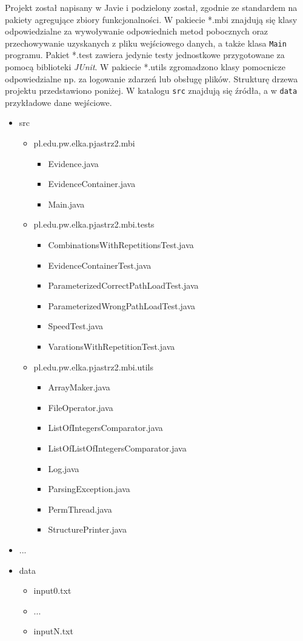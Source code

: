 \documentclass[11pt,a4paper]{article}
\begin{document}
Projekt został napisany w Javie i podzielony został, zgodnie ze standardem na pakiety agregujące zbiory funkcjonalności. W pakiecie *.mbi znajdują się klasy odpowiedzialne za wywoływanie odpowiednich metod pobocznych oraz przechowywanie uzyskanych z pliku wejściowego danych, a także klasa {\tt Main} programu. Pakiet *.test zawiera jedynie testy jednostkowe przygotowane za pomocą biblioteki \emph{JUnit}\cite{junit}. W pakiecie *.utils zgromadzono klasy pomocnicze odpowiedzialne np. za logowanie zdarzeń lub obsługę plików. Strukturę drzewa projektu przedstawiono poniżej. W katalogu {\tt src} znajdują się źródła, a w {\tt data} przykładowe dane wejściowe.

\begin{itemize}
	\item{src}
	\begin{itemize}
		\item{pl.edu.pw.elka.pjastrz2.mbi}
			\begin{itemize}
				\item{Evidence.java}
				\item{EvidenceContainer.java}
				\item{Main.java}
			\end{itemize}
		\item{pl.edu.pw.elka.pjastrz2.mbi.tests}
			\begin{itemize}
				\item{CombinationsWithRepetitionsTest.java}
				\item{EvidenceContainerTest.java}
				\item{ParameterizedCorrectPathLoadTest.java}
				\item{ParameterizedWrongPathLoadTest.java}
				\item{SpeedTest.java}
				\item{VarationsWithRepetitionTest.java}
			\end{itemize}
		\item{pl.edu.pw.elka.pjastrz2.mbi.utils}
			\begin{itemize}
				\item{ArrayMaker.java}
				\item{FileOperator.java}
				\item{ListOfIntegersComparator.java}
				\item{ListOfListOfIntegersComparator.java}
				\item{Log.java}
				\item{ParsingException.java}
				\item{PermThread.java}
				\item{StructurePrinter.java}
			\end{itemize}
	\end{itemize}
	\item{...}
	\item{data}
	\begin{itemize}
		\item input0.txt
		\item ...
		\item inputN.txt
	\end{itemize}
\end{itemize}
\end{document}
